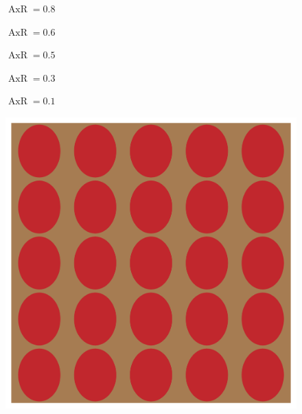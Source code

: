 \documentclass[a4paper,num-refs]{oup-contemporary}
\begin{document}
\begin{figure} 
	\centering
	\begin{minipage}[b]{0.19\linewidth}
		\centering
		$\operatorname{AxR}=0.8	$
	\end{minipage}
	\begin{minipage}[b]{0.19\linewidth}
		\centering
		$\operatorname{AxR}=0.6	$
	\end{minipage}
	\begin{minipage}[b]{0.19\linewidth}
		\centering
		$	\operatorname{AxR}=0.5$
	\end{minipage}
	\begin{minipage}[b]{0.19\linewidth}
		\centering
		$	\operatorname{AxR}=0.3$
	\end{minipage}
	\begin{minipage}[b]{0.19\linewidth}
		\centering
		$	\operatorname{AxR}=0.1$
	\end{minipage} 
	\begin{minipage}[b]{0.19\linewidth}
		\includegraphics[width=\linewidth]{test_mesh_axR_0.8.png}
	\end{minipage} 
	\begin{minipage}[b]{0.19\linewidth}

\end{minipage}
\end{figure}
\end{document}
